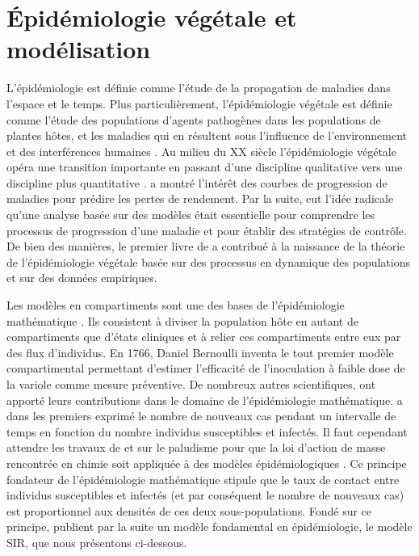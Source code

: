 	
\section{Épidémiologie végétale et modélisation}
\label{sec:epimod}
	
	L'épidémiologie est définie comme l'étude de la propagation de maladies dans l'espace et le temps. Plus particulièrement, l'épidémiologie végétale est définie comme \og l’étude des populations d'agents pathogènes dans les populations de plantes hôtes, et les maladies qui en résultent sous l'influence de l'environnement et des interférences humaines \fg{} \citep{Kranz1990}. 
	Au milieu du XX siècle l’épidémiologie végétale  opéra une transition importante en passant d'une discipline qualitative  vers une discipline plus quantitative \citep{Madden2007}. \citet{Large1952} a montré l’intérêt des courbes de progression de maladies pour prédire les pertes de rendement. Par la suite, \citet{Vanderplank1960} eut l'idée radicale  qu’une analyse basée sur des modèles était essentielle pour comprendre les processus de progression d’une maladie et pour établir des stratégies de contrôle.  De bien des manières, le premier livre de \citet{Vanderplank1963} a  contribué à la naissance de la théorie de l’épidémiologie végétale basée sur des processus en dynamique des populations et sur des données empiriques.
	
	
	
	Les modèles en compartiments sont une des bases de l'épidémiologie mathématique \citep{Anderson1991, Dieckmann2000}. Ils consistent à diviser la population hôte en autant de compartiments que d’états cliniques et à relier ces compartiments entre eux par des flux d’individus. En 1766, Daniel Bernoulli inventa le tout premier modèle compartimental   permettant d'estimer l’efficacité de l'inoculation à faible dose de la variole comme  mesure préventive.
	De nombreux autres scientifiques, ont apporté leurs contributions dans le domaine de l'épidémiologie mathématique. 
\citet{Hamer1906} a dans les premiers exprimé le nombre de nouveaux cas pendant un intervalle de temps en fonction du nombre individus susceptibles et infectés. Il faut cependant attendre les travaux de \citet{Ross1911} et \citet{McKendrick1912} sur le paludisme pour que la loi d'action de masse rencontrée en chimie soit appliquée à des modèles épidémiologiques \citep{Heesterbeek2005}. Ce principe fondateur de l'épidémiologie mathématique stipule que le taux de contact entre individus susceptibles et infectés (et par conséquent le nombre de nouveaux cas) est proportionnel aux densités de ces deux sous-populations. Fondé sur ce principe, \citet{Kermack1927} publient par la suite un modèle fondamental en épidémiologie, le modèle SIR, que nous présentons ci-dessous.
	
